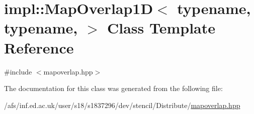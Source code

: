 \hypertarget{classimpl_1_1MapOverlap1D}{\section{impl\-:\-:Map\-Overlap1\-D$<$ typename, typename, $>$ Class Template Reference}
\label{classimpl_1_1MapOverlap1D}
}


{\ttfamily \#include $<$mapoverlap.\-hpp$>$}



The documentation for this class was generated from the following file\-:\begin{DoxyCompactItemize}
\item 
/afs/inf.\-ed.\-ac.\-uk/user/s18/s1837296/dev/stencil/\-Distribute/\hyperlink{mapoverlap_8hpp}{mapoverlap.\-hpp}\end{DoxyCompactItemize}
